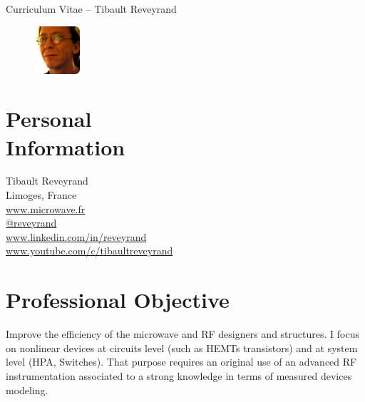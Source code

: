 \documentclass[margin,line]{resume}
\begin{document}
{\sc \Large Curriculum Vitae -- Tibault Reveyrand}
\begin{resume}


    \vspace{0.5cm}
    \begin{figure}
         \vspace{-0.9cm}
        \begin{center}
        \includegraphics[width=0.15\textwidth]{reveyrand_face.png}
        \end{center}
         \vspace{-1cm}
    \end{figure}

 
    \section{\mysidestyle Personal\\Information}
    Tibault Reveyrand \\
    Limoges, France\\ 
    \faTv  \space \href{http://www.microwave.fr}{www.microwave.fr} \\ 
    \faTwitter  \space \href{https://twitter.com/reveyrand/}{@reveyrand} \\
    \faLinkedin \space \href{http://www.linkedin.com/in/reveyrand/}{www.linkedin.com/in/reveyrand} \\ 
    \faYoutubePlay  \space \href{https://www.youtube.com/c/tibaultreveyrand/}{www.youtube.com/c/tibaultreveyrand}
   

    \section{\mysidestyle Professional Objective}
    Improve the efficiency of the microwave and RF designers and structures. I focus on nonlinear devices at circuits level (such as HEMTs transistors) and at system level (HPA, Switches). That purpose requires an original use of an advanced RF instrumentation associated to a strong knowledge in terms of measured devices modeling.
 

\end{resume}
\end{document}
